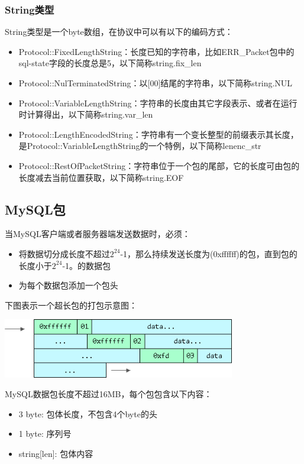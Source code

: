\documentclass[a4paper, titlepage, 10pt, bookmark]{article}
\begin{document}
\subsubsection{String类型}
String类型是一个byte数组，在协议中可以有以下的编码方式：
\begin{itemize}
    \item Protocol::FixedLengthString：长度已知的字符串，比如ERR\_Packet包中的sql-state字段的长度总是5，以下简称string.fix\_len
    \item Protocol::NulTerminatedString：以[00]结尾的字符串，以下简称string.NUL
    \item Protocol::VariableLengthString：字符串的长度由其它字段表示、或者在运行时计算得出，以下简称string.var\_len
    \item Protocol::LengthEncodedString：字符串有一个变长整型的前缀表示其长度，是Protocol::VariableLengthString的一个特例，以下简称lenenc\_str
    \item Protocol::RestOfPacketString：字符串位于一个包的尾部，它的长度可由包的长度减去当前位置获取，以下简称string.EOF
\end{itemize}



\subsection{MySQL包}
当MySQL客户端或者服务器端发送数据时，必须：
\begin{itemize}
    \item 将数据切分成长度不超过$2^{24}$-1，那么持续发送长度为(0xffffff)的包，直到包的长度小于$2^{24}$-1。的数据包
    \item 为每个数据包添加一个包头
\end{itemize}

下图表示一个超长包的打包示意图：
\begin{center}
\includegraphics[width=4in]{027.png}
\end{center}

MySQL数据包长度不超过16MB，每个包包含以下内容：
\begin{itemize}
    \item 3 byte:      包体长度，不包含4个byte的头
    \item 1 byte:      序列号
    \item string[len]: 包体内容
\end{itemize}
\end{document}
